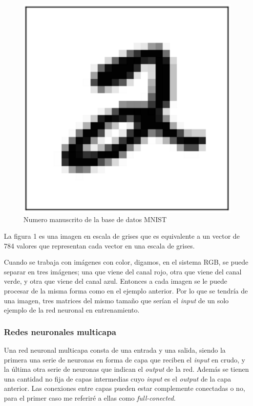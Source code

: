 \documentclass[14pt,a4paper]{report}
\begin{document}
\begin{figure}[h]
  \centering
  \includegraphics[scale=0.5]{../MNIST.png} 
  \caption{Numero manuscrito de la base de datos MNIST}
  \label{fig:neural-network}
\end{figure}

La figura 1 es una imagen en escala de grises que es equivalente a un vector de 784 valores que representan cada vector en una escala de grises.

Cuando se trabaja con imágenes con color, digamos, en el sistema RGB, se puede separar en tres imágenes; una que viene del canal rojo, otra que viene del canal verde, y otra que viene del canal azul. Entonces a cada imagen se le puede procesar de la misma forma como en el ejemplo anterior. Por lo que se tendría de una imagen, tres matrices del mismo tamaño que serían el \textit{input} de un solo ejemplo de la red neuronal en entrenamiento.

\subsubsection*{Redes neuronales multicapa}

Una red neuronal multicapa consta de una entrada y una salida, siendo la primera una serie de neuronas en forma de capa que reciben el \textit{input} en crudo, y la última otra serie de neuronas que indican el \textit{output} de la red. Además se tienen una cantidad no fija de capas intermedias cuyo \textit{input} es el \textit{output} de la capa anterior. Las conexiones entre capas pueden estar complemente conectadas o no, para el primer caso me referiré a ellas como \textit{full-conected}.
\end{document}
